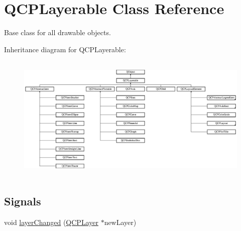 \hypertarget{class_q_c_p_layerable}{}\section{Q\+C\+P\+Layerable Class Reference}
\label{class_q_c_p_layerable}


Base class for all drawable objects.  


Inheritance diagram for Q\+C\+P\+Layerable\+:\begin{figure}[H]
\begin{center}
\leavevmode
\includegraphics[height=6.075950cm]{class_q_c_p_layerable}
\end{center}
\end{figure}
\subsection*{Signals}
\begin{DoxyCompactItemize}
\item 
void \hyperlink{class_q_c_p_layerable_abbf8657cedea73ac1c3499b521c90eba}{layer\+Changed} (\hyperlink{class_q_c_p_layer}{Q\+C\+P\+Layer} $\ast$new\+Layer)
\end{DoxyCompactItemize}
